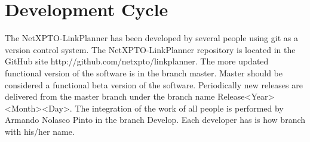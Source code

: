 
\chapter{Development Cycle}

The NetXPTO-LinkPlanner has been developed by several people using git as a version control system.
The NetXPTO-LinkPlanner repository is located in the GitHub site http://github.com/netxpto/linkplanner.
The more updated functional version of the software is in the branch master.
Master should be considered a functional beta version of the software.
Periodically new releases are delivered from the master branch under the branch name Release<Year><Month><Day>.
The integration of the work of all people is performed by Armando Nolasco Pinto in the branch Develop.
Each developer has is how branch with his/her name.



